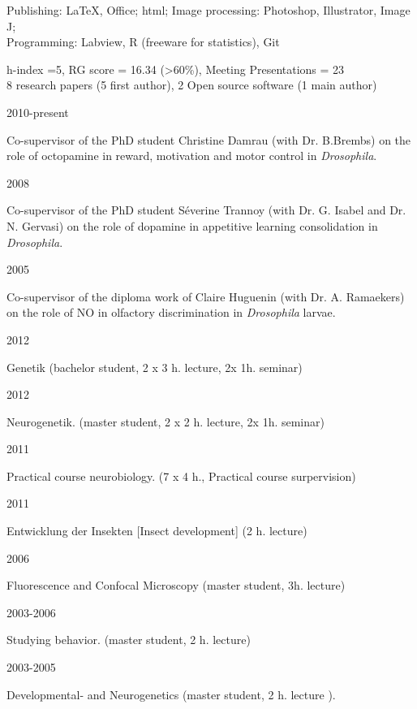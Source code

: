 Publishing: \LaTeX, Office; html;
 Image processing: Photoshop, Illustrator, Image J; 
\\Programming:  Labview, R (freeware for statistics), Git

\newpage
{}
%
h-index =5,
RG score = 16.34 (>60\%),
Meeting Presentations = 23
\\
8 research papers (5 first author), 2 Open source software (1 main author)



\parbox{0.15\textwidth}{2010-present}\hfill
	\parbox[t]{0.83\textwidth}{Co-supervisor of the PhD student Christine Damrau
(with Dr. B.Brembs) on the role of octopamine in reward, motivation and motor control in  \textit{Drosophila}.}
\parbox{0.15\textwidth}{2008}\hfill
	\parbox[t]{0.83\textwidth}{Co-supervisor of the PhD student S\'everine Trannoy
(with Dr. G. Isabel and Dr. N. Gervasi) on the role of dopamine in appetitive learning consolidation in  \textit{Drosophila}.}
\parbox{0.15\textwidth}{2005}\hfill
\parbox[t]{0.83\textwidth}{Co-supervisor of the diploma work of Claire Huguenin
(with Dr. A. Ramaekers) on the role of NO in olfactory discrimination in \textit{Drosophila} larvae.}





\parbox{0.15\textwidth}{2012}\hfill
\parbox[t]{0.83\textwidth}{Genetik (bachelor student, 2 x 3 h. lecture, 2x 1h. seminar)}
\parbox{0.15\textwidth}{2012}\hfill
\parbox[t]{0.83\textwidth}{Neurogenetik. (master student, 2 x 2 h. lecture, 2x 1h. seminar)}

\parbox{0.15\textwidth}{2011}\hfill
\parbox[t]{0.83\textwidth}{Practical course neurobiology. (7 x 4 h., Practical course surpervision)}
\parbox{0.15\textwidth}{2011}\hfill
\parbox[t]{0.83\textwidth}{Entwicklung der Insekten [Insect development] (2 h. lecture)}
 
\parbox{0.15\textwidth}{2006}\hfill
\parbox[t]{0.83\textwidth}{Fluorescence and Confocal Microscopy (master student, 3h. lecture)}
\parbox{0.15\textwidth}{2003-2006}\hfill
\parbox[t]{0.83\textwidth}{Studying behavior. (master student, 2 h. lecture)}
\parbox{0.15\textwidth}{2003-2005}\hfill
\parbox[t]{0.83\textwidth}{Developmental- and Neurogenetics %
(master student, 2 h. lecture%
).}



